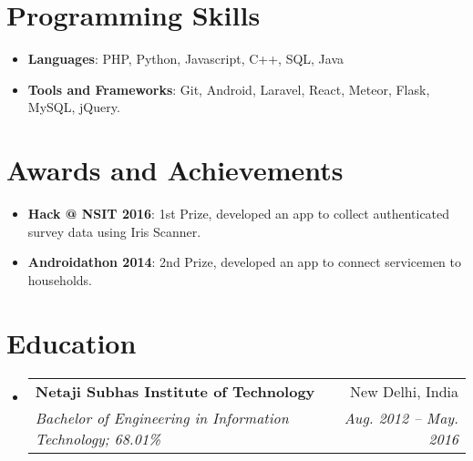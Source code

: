 \documentclass[letterpaper,11pt]{article}
\makeatletter
\newcommand{\resumeItem}[2]{
  \item\small{
    \textbf{#1}{: #2 \vspace{-2pt}}
  }
}
\newcommand{\resumeSubheading}[4]{
  \vspace{-1pt}\item
    \begin{tabular*}{0.97\textwidth}{l@{\extracolsep{\fill}}r}
      \textbf{#1} & #2 \\
      \textit{\small#3} & \textit{\small #4} \\
    \end{tabular*}\vspace{-5pt}
}
\newcommand{\resumeSubItem}[2]{\resumeItem{#1}{#2}\vspace{-4pt}}
\newcommand{\resumeSubHeadingListStart}{\begin{itemize}[leftmargin=*]}
\newcommand{\resumeSubHeadingListEnd}{\end{itemize}}
\makeatother
\begin{document}
  
\section{Programming Skills}
 \resumeSubHeadingListStart
    \resumeSubItem{Languages}
       {PHP, Python, Javascript, C++, SQL, Java}
    \resumeSubItem{Tools and Frameworks}
       {Git, Android, Laravel, React, Meteor, Flask, MySQL, jQuery.}
 \resumeSubHeadingListEnd

\section{Awards and Achievements}
  \resumeSubHeadingListStart
    \resumeSubItem{Hack @ NSIT 2016}
       {1st Prize, developed an app to collect authenticated survey data using Iris Scanner.}
    \resumeSubItem{Androidathon 2014}
       {2nd Prize, developed an app to connect servicemen to households.}
  \resumeSubHeadingListEnd


\section{Education}
  \resumeSubHeadingListStart
    \resumeSubheading
      {Netaji Subhas Institute of Technology}{New Delhi, India}
      {Bachelor of Engineering in Information Technology;  68.01\%}{Aug. 2012 -- May. 2016}
  \resumeSubHeadingListEnd
\end{document}
